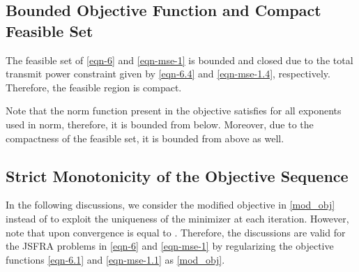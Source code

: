 \subsection{Bounded Objective Function and Compact Feasible Set} \label{b_obj}
The feasible set of \eqref{eqn-6} and \eqref{eqn-mse-1} is bounded and closed due to the total transmit power constraint given by \eqref{eqn-6.4} and \eqref{eqn-mse-1.4}, respectively. Therefore, the feasible region is compact.%

Note that the norm function present in the objective satisfies  for all exponents  used in  norm, therefore, it is bounded from below. Moreover, due to the compactness of the feasible set, it is bounded from above as well.

\subsection{Strict Monotonicity of the Objective Sequence} \label{mcity}
In the following discussions, we consider the modified objective  in \eqref{mod_obj} instead of  to exploit the uniqueness of the minimizer at each iteration. However, note that upon convergence  is equal to . Therefore, the discussions are valid for the \ac{JSFRA} problems in \eqref{eqn-6} and \eqref{eqn-mse-1} by regularizing the objective functions \eqref{eqn-6.1} and \eqref{eqn-mse-1.1} as \eqref{mod_obj}.

